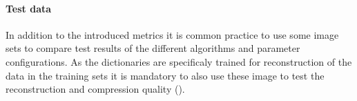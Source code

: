 \paragraph{Test data}
In addition to the introduced metrics it is common practice to use some image
sets to compare test results of the different algorithms and parameter
configurations. As the dictionaries are specificaly trained for
reconstruction of the data in the training sets it is mandatory to also use
these image to test the reconstruction and compression quality
().
\begin{figure}[h]
\centering
{}
\hspace{5mm}
\hspace{5mm}
\hspace{5mm}
\hspace{5mm}

\end{figure}
